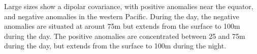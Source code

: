 Large sizes show a dipolar covariance, with positive anomalies near the equator, and negative anomalies in the western Pacific. 
During the day, the negative anomalies are situated at arount 75m but extends from the surface to 100m during the day. The positive anomalies are concentrated between 25 and 75m during the day, but extends from the surface to 100m during the night.

%
%

\clearpage
